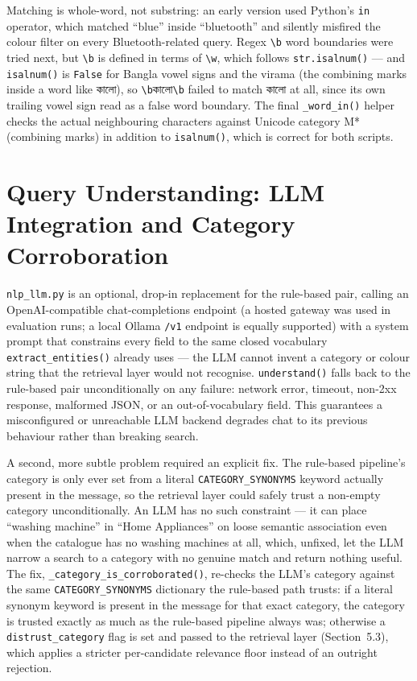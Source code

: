 \documentclass[12pt,a4paper]{report}
\newcommand{\bn}[1]{{\bengalifont #1}}
\begin{document}
Matching is whole-word, not substring: an early version used Python's \texttt{in} operator, which matched
``blue'' inside ``bluetooth'' and silently misfired the colour filter on every Bluetooth-related query.
Regex \texttt{\textbackslash b} word boundaries were tried next, but \texttt{\textbackslash b} is defined
in terms of \texttt{\textbackslash w}, which follows \texttt{str.isalnum()} --- and \texttt{isalnum()} is
\texttt{False} for Bangla vowel signs and the virama (the combining marks inside a word like \bn{কালো}),
so \texttt{\textbackslash b}\bn{কালো}\texttt{\textbackslash b} failed to match \bn{কালো} at all, since its
own trailing vowel sign read as a false word boundary. The final \texttt{\_word\_in()} helper checks the
actual neighbouring characters against Unicode category M* (combining marks) in addition to
\texttt{isalnum()}, which is correct for both scripts.

\section{Query Understanding: LLM Integration and Category Corroboration}
\texttt{nlp\_llm.py} is an optional, drop-in replacement for the rule-based pair, calling an
OpenAI-compatible chat-completions endpoint (a hosted gateway was used in evaluation runs; a local Ollama
\texttt{/v1} endpoint is equally supported) with a system prompt that constrains every field to the same
closed vocabulary \texttt{extract\_entities()} already uses --- the LLM cannot invent a category or colour
string that the retrieval layer would not recognise. \texttt{understand()} falls back to the rule-based
pair unconditionally on any failure: network error, timeout, non-2xx response, malformed JSON, or an
out-of-vocabulary field. This guarantees a misconfigured or unreachable LLM backend degrades chat to its
previous behaviour rather than breaking search.

A second, more subtle problem required an explicit fix. The rule-based pipeline's category is only ever
set from a literal \texttt{CATEGORY\_SYNONYMS} keyword actually present in the message, so the retrieval
layer could safely trust a non-empty category unconditionally. An LLM has no such constraint --- it can
place ``washing machine'' in ``Home Appliances'' on loose semantic association even when the catalogue has
no washing machines at all, which, unfixed, let the LLM narrow a search to a category with no genuine
match and return nothing useful. The fix, \texttt{\_category\_is\_corroborated()}, re-checks the LLM's
category against the same \texttt{CATEGORY\_SYNONYMS} dictionary the rule-based path trusts: if a literal
synonym keyword is present in the message for that exact category, the category is trusted exactly as much
as the rule-based pipeline always was; otherwise a \texttt{distrust\_category} flag is set and passed to
the retrieval layer (Section~5.3), which applies a stricter per-candidate relevance floor instead of an
outright rejection.
\end{document}
